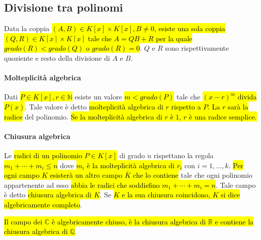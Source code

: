 \subsection{Divisione tra polinomi}
Data la coppia \hl{$(A, B) \in K[x] \times K[x], B \neq 0$, esiste una sola coppia
$(Q, R) \in K[x] \times K[x]$ tale che $A = QB + R$ per la quale $grado(R) < grado(Q)$
o $grado(R) = 0$}. $Q$ e $R$ sono rispettivamente quoziente e resto della divisione
di $A$ e $B$.

\paragraph{Molteplicità algebrica} Dati \hl{$P \in K[x], r \in \mathbb{N}$} esiste
un valore \hl{$m < grado(P)$} tale che \hl{${(x-r)}^m$ divida $P(x)$}. Tale valore è
detto \hl{molteplicità algebrica di $r$ rispetto a $P$. La $r$ sarà la radice} del
polinomio. \hl{Se la molteplicità algebrica di $r$ è $1$, $r$ è una radice semplice.}

\paragraph{Chiusura algebrica} Le \hl{radici di un polinomio $P \in K[x]$} di grado
$n$ rispettano la regola \\ \hl{$m_1 + \cdots + m_i \leq n$} dove \hl{$m_i$ è la
molteplicità algebrica di $r_i$} con $i = 1, \ldots, k$. \hl{Per ogni campo $K$
esisterà un altro campo $\bar{K}$ che lo contiene} tale che ogni polinomio
appartenente ad esso \hl{abbia le radici che soddisfino $m_1 + \cdots + m_i = n$}.
Tale campo è detto \hl{chiusura algebrica di $K$}. Se \hl{$K$ e la sua chiusura
coincidono, $K$ si dice algebricamente completo}.

\hl{Il campo dei $\mathbb{C}$ è algebricamente chiuso, è la chiusura algebrica di
$\mathbb{R}$ e contiene la chiusura algebrica di $\mathbb{Q}$}. 
